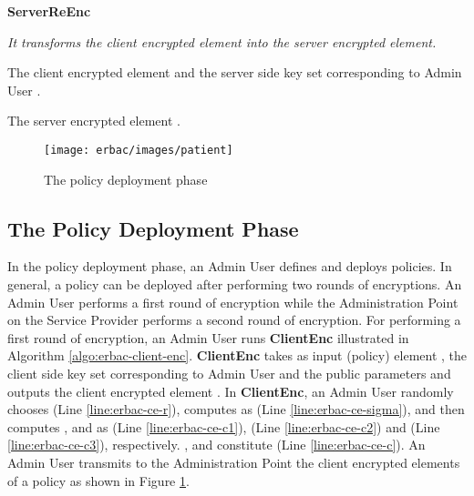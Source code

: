 \documentclass[epsfig,a4paper,11pt,titlepage]{book}
\numberwithin{algorithm}{chapter}
\newcommand{\algofontsize}{\fontsize{11}{12}\selectfont}
\begin{document}
\begin{algorithm} [htp]
{\algofontsize
\caption{\textbf{ServerReEnc}}

\label{algo:erbac-server-re-enc}

\begin{algorithmic}[1]

\INPUT \emph{It transforms the client encrypted element into the server encrypted element.}

\Require The client encrypted element  and the server side key set  corresponding to Admin User .

\Ensure The server encrypted element .

\medskip

\State  \label{line:erbac-se-c1}
\State  \label{line:erbac-se-c2}
\State  \label{line:erbac-se-c}

\Return 

\end{algorithmic}
}
\end{algorithm}




\begin{figure} [htp]
\centering
\texttt{[image: erbac/images/patient]} \caption{The policy deployment phase}
\label{fig:erbac-patient}
\end{figure}


\subsection{The Policy Deployment Phase}
\label{sec:espoon-policy-deployment-phase}
In the policy deployment phase, an Admin User defines and deploys policies. In general, a policy can be deployed after performing two rounds of encryptions. An Admin User performs a first round of encryption while the Administration Point on the Service Provider performs a second round of encryption. For performing a first round of encryption, an Admin User runs \textbf{ClientEnc} illustrated in Algorithm \ref{algo:erbac-client-enc}. \textbf{ClientEnc} takes as input (policy) element , the client side key set  corresponding to Admin User  and the public parameters  and outputs the client encrypted element . In \textbf{ClientEnc}, an Admin User randomly chooses  (Line \ref{line:erbac-ce-r}), computes  as  (Line \ref{line:erbac-ce-sigma}), and then computes ,  and  as  (Line \ref{line:erbac-ce-c1}),  (Line \ref{line:erbac-ce-c2}) and  (Line \ref{line:erbac-ce-c3}), respectively. ,  and  constitute  (Line \ref{line:erbac-ce-c}). An Admin User transmits to the Administration Point the client encrypted elements of a policy as shown in Figure \ref{fig:erbac-patient}.
\end{document}
